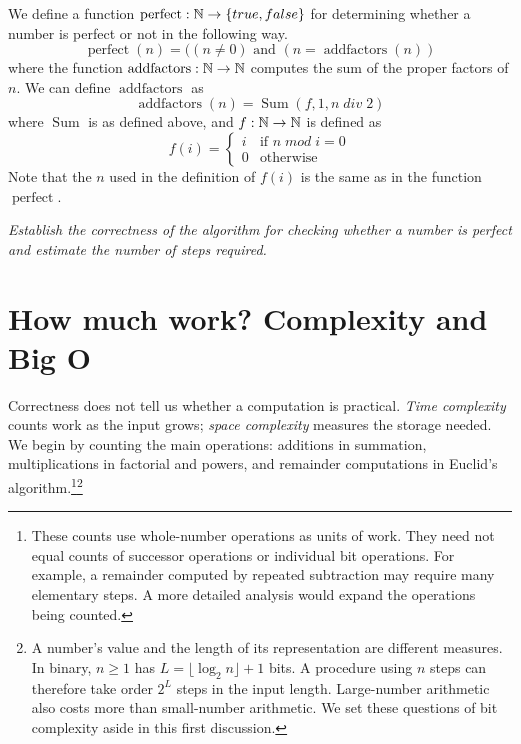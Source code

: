 We define a function $\operatorname{perfect}: \mathbb{N} \rightarrow \{true,false\}$ for determining
whether a number is perfect or not in the following way.
\[
\operatorname{perfect}(n) = ((n \neq 0) \text{ and } (n = \operatorname{addfactors}(n))
\]
where the function $\operatorname{addfactors}: \mathbb{N} \rightarrow \mathbb{N}$ computes the sum of the
proper factors of $n$. We can define $\operatorname{addfactors}$ as
\[
\operatorname{addfactors}(n) = \operatorname{Sum}(f,1,n\;div\;2)
\]
where $\operatorname{Sum}$ is as defined above,
and $f: \mathbb{N} \rightarrow \mathbb{N}$ is defined as
\[
f(i) = \left\{      
                \begin{array}{ll}
                i   &       \mbox{if $n\;mod\;i = 0$} \\
                0   & \mbox{otherwise}
                \end{array}
        \right.
\]
Note that the $n$ used in the definition of $f(i)$ is the same as in the
function $\operatorname{perfect}$. 

\begin{exercise}
{\em 
Establish the correctness of the algorithm for checking whether a number is perfect and estimate the number of steps required.
}
\end{exercise}

\section{How much work? Complexity and Big O}
\label{sec:algorithms-complexity}

Correctness does not tell us whether a computation is practical.
\emph{Time complexity} counts work as the input grows; \emph{space
complexity} measures the storage needed. We begin by counting the main
operations: additions in summation, multiplications in factorial and powers,
and remainder computations in Euclid's algorithm.\footnote{These counts use
whole-number operations as units of work. They need not equal counts of
successor operations or individual bit operations. For example, a remainder
computed by repeated subtraction may require many elementary steps. A more
detailed analysis would expand the operations being counted.}\footnote{A
number's value and the length of its representation are different measures.
In binary, $n\geq1$ has $L=\lfloor\log_2 n\rfloor+1$ bits. A procedure
using $n$ steps can therefore take order $2^L$ steps in the input length.
Large-number arithmetic also costs more than small-number arithmetic.
We set these questions of bit complexity aside in this first discussion.}

